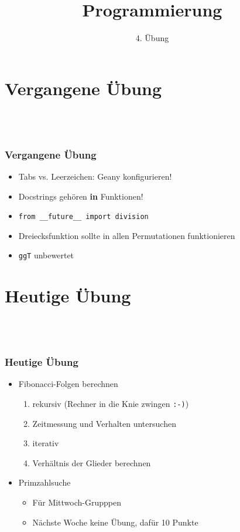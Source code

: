 
\title{Programmierung}
\subtitle{4. Übung}

\newcommand{\s}{\textvisiblespace}
\newcommand{\bs}{\s\s\s\s}


    \begin{frame}
        \frontframe
    \end{frame}

    \section{Vergangene Übung}
    \subsection{~}

    \begin{frame}
        \frametitle{Vergangene Übung}
        \begin{itemize}
        \item Tabs vs. Leerzeichen: Geany konfigurieren!
        \pause
        \item Docstrings gehören \textbf{in} Funktionen!
        \pause
        \item \texttt{from \_\_future\_\_ import division}
        \pause
        \item Dreiecksfunktion sollte in allen Permutationen funktionieren
        \pause
        \item \texttt{ggT} unbewertet
        \end{itemize}
    \end{frame}

    \section{Heutige Übung}
    \subsection{~}

    \begin{frame}
        \frametitle{Heutige Übung}
        \begin{itemize}
        \item Fibonacci-Folgen berechnen
            \begin{enumerate}
            \item rekursiv {\tiny(Rechner in die Knie zwingen \texttt{:-)})}
            \item Zeitmessung und Verhalten untersuchen
            \item iterativ
            \item Verhältnis der Glieder berechnen
            \end{enumerate}
        \item Primzahlsuche
            \begin{itemize}
            \item Für Mittwoch-Grupppen
            \item Nächste Woche keine Übung, dafür 10 Punkte
            \end{itemize}
        \end{itemize}
    \end{frame}


